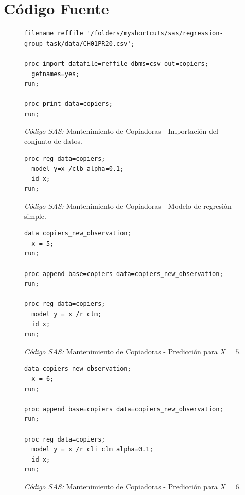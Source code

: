 \documentclass{article}
\begin{document}
  \part{Código Fuente}

    \begin{figure}[H]
      \centering
      \begin{verbatim}
filename reffile '/folders/myshortcuts/sas/regression-group-task/data/CH01PR20.csv';

proc import datafile=reffile dbms=csv out=copiers;
  getnames=yes;
run;

proc print data=copiers;
run;
      \end{verbatim}
      \caption{\emph{Código SAS:} Mantenimiento de Copiadoras - Importación del conjunto de datos.}
      \label{code:sas-copiers-1}
    \end{figure}


    \begin{figure}[H]
      \centering
      \begin{verbatim}
proc reg data=copiers;
  model y=x /clb alpha=0.1;
  id x;
run;
      \end{verbatim}
      \caption{\emph{Código SAS:} Mantenimiento de Copiadoras - Modelo de regresión simple.}
      \label{code:sas-copiers-2}
    \end{figure}

    \begin{figure}[H]
      \centering
      \begin{verbatim}
data copiers_new_observation;
  x = 5;
run;

proc append base=copiers data=copiers_new_observation;
run;

proc reg data=copiers;
  model y = x /r clm;
  id x;
run;
      \end{verbatim}
      \caption{\emph{Código SAS:} Mantenimiento de Copiadoras - Predicción para $X = 5$.}
      \label{code:sas-copiers-3}
    \end{figure}

    \begin{figure}[H]
      \centering
      \begin{verbatim}
data copiers_new_observation;
  x = 6;
run;

proc append base=copiers data=copiers_new_observation;
run;

proc reg data=copiers;
  model y = x /r cli clm alpha=0.1;
  id x;
run;
      \end{verbatim}
      \caption{\emph{Código SAS:} Mantenimiento de Copiadoras - Predicción para $X = 6$.}
      \label{code:sas-copiers-4}
    \end{figure}
\end{document}
